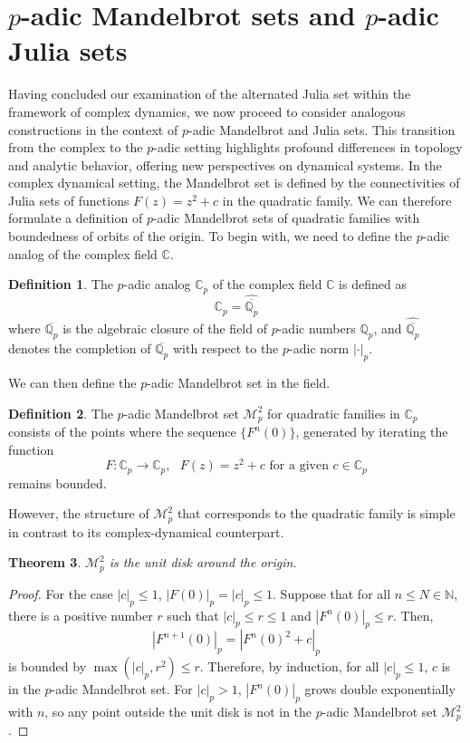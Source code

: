 \documentclass{amsart}
\theoremstyle{plain}
\newtheorem{theorem}{Theorem}[section]
\theoremstyle{definition}
\newtheorem{definition}[theorem]{Definition}
\theoremstyle{remark}
\numberwithin{equation}{section}
\newcommand{\C}{\mathbb{C}}
\newcommand{\N}{\mathbb{N}}
\newcommand{\Q}{\mathbb{Q}}
\newcommand{\calm}{\mathcal{M}}
\begin{document}
\section{$p$-adic Mandelbrot sets and $p$-adic Julia sets} Having concluded our examination of the alternated Julia set within the framework of complex dynamics, we now proceed to consider analogous constructions in the context of $p$-adic Mandelbrot and Julia sets. This transition from the complex to the $p$-adic setting highlights profound differences in topology and analytic behavior, offering new perspectives on dynamical systems.
In the complex dynamical setting, the Mandelbrot set is defined by the connectivities of Julia sets of functions $F(z) = z^2 + c$ in the quadratic family. We can therefore formulate a definition of $p$-adic Mandelbrot sets of quadratic families with boundedness of orbits of the origin. To begin with, we need to define the $p$-adic analog of the complex field $\C$.
\begin{definition}
    The $p$-adic analog $\C_p$ of the complex field $\C$ is defined as
\[
\C_p = \widehat{\overline{\Q_p}}
\]
where \(\overline{\Q_p}\) is the algebraic closure of the field of \(p\)-adic numbers \(\Q_p\),
    and \(\widehat{\overline{\Q_p}}\) denotes the completion of \(\overline{\Q_p}\) with respect to the \(p\)-adic norm \(|\cdot|_p\).
\end{definition}
We can then define the $p$-adic Mandelbrot set in the field.
\begin{definition}
    \label{def:order}
    The $p$-adic Mandelbrot set $\calm_p^2$ for quadratic families in $\C_p$ consists of the points where the sequence $\{F^n(0)\}$, generated by iterating the function \[F: \C_p \to \C_p, \text{ } F(z) = z^2 + c \text{ for a given } c\in\C_p\] remains bounded.
\end{definition}
However, the structure of $\calm_p^2$ that corresponds to the quadratic family is simple in contrast to its complex-dynamical counterpart. 
\begin{theorem}\cite[Page 2]{MR3113229}
    $\calm_p^2$ is the unit disk around the origin. 
\end{theorem}
\begin{proof}
    For the case $|c|_p \leq 1$, $|F(0)|_p = |c|_p \leq 1$.
Suppose that for all $n\leq N\in\N$, there is a positive number $r$ such that $|c|_p \leq r \leq 1$ and $|F^n(0)|_p \leq r$. Then, \[|F^{n+1}(0)|_p = |F^n(0)^2 + c|_p\] is bounded by $\max(|c|_p, r^2)\leq r$. Therefore, by induction, for all $|c|_p \leq 1$, $c$ is in the $p$-adic Mandelbrot set. For $|c|_p > 1$, $|F^n(0)|_p$ grows double exponentially with $n$, so any point outside the unit disk is not in the $p$-adic Mandelbrot set $\calm_p^2$.
\end{proof}
\end{document}
